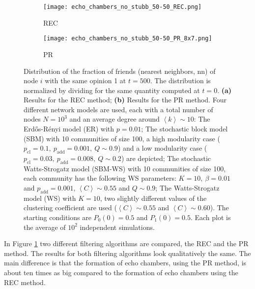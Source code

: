 \documentclass[11 pt , letterpaper , twoside , openright]{book}
\begin{document}
\begin{figure}[H]
  \begin{subfigure}[b]{0.49\textwidth}
  	\texttt{[image: echo\_chambers\_no\_stubb\_50-50\_REC.png]}
    \caption{REC}
  \end{subfigure}
  \begin{subfigure}[b]{0.49\textwidth}
  	\texttt{[image: echo\_chambers\_no\_stubb\_50-50\_PR\_8x7.png]}
    \caption{PR}
  \end{subfigure}
  \captionsetup{format=plain}
  \caption[Distribution of the fraction of friends (nearest neighbors, nn) of node $i$ with the same opinion 1 at $t=500$, $\left<P_1^{\text{nn}}\right>$, for an initial $50/50$ opinion distribution.]{Distribution of the fraction of friends (nearest neighbors, nn) of node $i$ with the same opinion 1 at $t = 500$. The distribution is normalized by dividing for the same quantity computed at $t=0$. \textbf{(a)} Results for the REC method; \textbf{(b)} Results for the PR method. Four different network models are used, each with a total number of nodes $N = 10^3$ and an average degree around $\left<k\right> \sim 10$: The Erd\H{o}s-R\'{e}nyi model (ER) with $p = 0.01$; The stochastic block model (SBM) with 10 communities of size 100, a high modularity case ($p_{\text{cl}} = 0.1,\ p_{\text{add}} = 0.001,\ Q \sim 0.9$) and a low modularity case ($p_{\text{cl}} = 0.03,\ p_{\text{add}} = 0.008,\ Q \sim 0.2$) are depicted; The stochastic Watts-Strogatz model (SBM-WS) with 10 communities of size 100, each community has the following WS parameters: $K = 10,\ \beta = 0.01$ and $p_{\text{add}} = 0.001$, $\left<C\right> \sim 0.55$ and $Q \sim 0.9$; The Watts-Strogatz model (WS) with $K = 10$, two slightly different values of the clustering coefficient are used ($\left<C\right> \sim 0.55$ and $\left<C\right> \sim 0.60$). The starting conditions are $P_0(0) = 0.5$ and $P_1(0) = 0.5$. Each plot is the average of $10^2$ independent simulations.}
\label{echo_50_50}
\end{figure}
\noindent
In Figure \ref{echo_50_50} two different filtering algorithms are compared, the REC and the PR method. The results for both filtering algorithms look qualitatively the same. The main difference is that the formation of echo chambers, using the PR method, is about ten times as big compared to the formation of echo chambers using the REC method. \\
\end{document}
